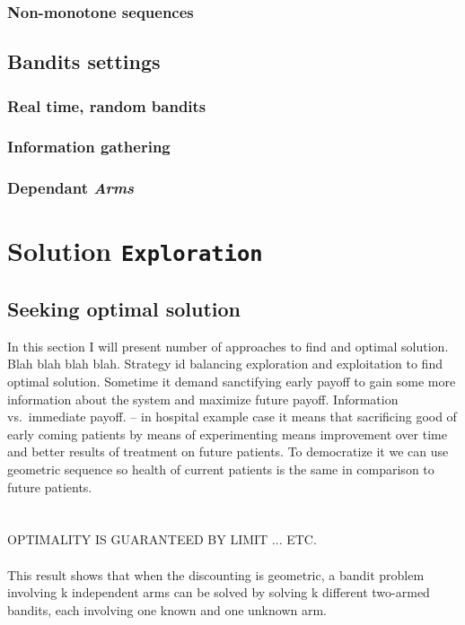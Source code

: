 \documentclass[12pt, a4paper, pdflatex, leqno]{report}
\begin{document}
\subsection{Non-monotone sequences}



\section{Bandits settings}
\subsection{Real time, random bandits}
\subsection{Information gathering}
\subsection{Dependant \emph{Arms}}



\chapter{Solution \texttt{\textbf{Exploration}}}

\section{Seeking optimal solution}
In this section I will present number of approaches to find and optimal solution.\\
Blah blah blah blah.
Strategy id balancing exploration and exploitation to find optimal solution. Sometime it demand sanctifying early payoff to gain some more information about the system and maximize future payoff.
Information vs.\ immediate payoff. -- in hospital example case it means that sacrificing good of early coming patients by means of experimenting means improvement over time and better results of treatment on future patients.
To democratize it we can use geometric sequence so health of current patients is the same in comparison to future patients.\\
\\
\\
OPTIMALITY IS GUARANTEED BY LIMIT ... ETC.
\\
\\
This result shows that when the discounting is geometric, a bandit problem involving k independent arms can be solved by solving k different two-armed bandits, each involving one known and one unknown arm.\\
\end{document}
